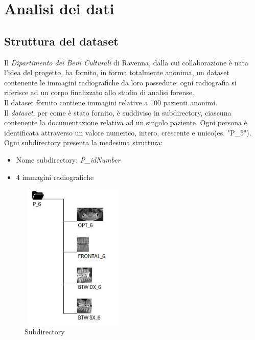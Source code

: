 \documentclass[12pt,a4paper,openright,twoside]{book}
\begin{document}

\chapter{Analisi dei dati}

\section{Struttura del dataset}
Il {\itshape Dipartimento dei Beni Culturali} di Ravenna, dalla cui collaborazione è nata l'idea del progetto, ha fornito, in forma totalmente anonima, un dataset contenente le immagini radiografiche da loro possedute; ogni radiografia si riferisce ad un corpo finalizzato allo studio di analisi forense. \\
Il dataset fornito contiene immagini relative a 100 pazienti anonimi.\\
Il {\itshape dataset}, per come è stato fornito, è suddiviso in subdirectory, ciascuna contenente la documentazione relativa ad un singolo paziente. Ogni persona è identificata attraverso un valore numerico, intero, crescente e unico(es. "P\_5"). \\
Ogni subdirectory presenta la medesima struttura: 
\begin{itemize}
\item Nome subdirectory: {\itshape P\_idNumber}
\item 4 immagini radiografiche
\end{itemize}
\newpage
\begin{figure}[H]
    \centering
    \includegraphics[height=7cm,width=5cm]{figures/subdir.pdf}
    \caption{Subdirectory}
    \label{fig:subdirectory}
\end{figure}
\end{document}
